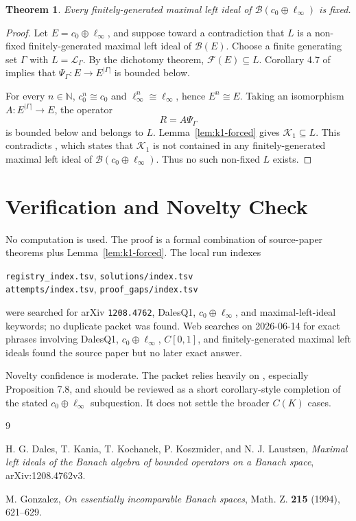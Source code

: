 \documentclass[11pt]{article}
\newtheorem{theorem}{Theorem}
\newcommand{\B}{\mathscr{B}}
\newcommand{\F}{\mathscr{F}}
\newcommand{\K}{\mathscr{K}}
\begin{document}
\begin{theorem}
Every finitely-generated maximal left ideal of
\(\B(c_0\oplus\ell_\infty)\) is fixed.
\end{theorem}

\begin{proof}
Let \(E=c_0\oplus\ell_\infty\), and suppose toward a contradiction that
\(L\) is a non-fixed finitely-generated maximal left ideal of \(\B(E)\).
Choose a finite generating set \(\Gamma\) with
\(L=\mathscr{L}_\Gamma\).  By the dichotomy theorem,
\(\F(E)\subseteq L\).  Corollary 4.7 of \cite{DKKKL} implies that
\(\Psi_\Gamma:E\to E^{|\Gamma|}\) is bounded below.

For every \(n\in\mathbb{N}\), \(c_0^n\cong c_0\) and
\(\ell_\infty^n\cong\ell_\infty\), hence \(E^n\cong E\).  Taking an
isomorphism \(A:E^{|\Gamma|}\to E\), the operator
\[
  R=A\Psi_\Gamma
\]
is bounded below and belongs to \(L\).  Lemma~\ref{lem:k1-forced} gives
\(\K_1\subseteq L\).  This contradicts \cite[Proposition 7.8]{DKKKL},
which states that \(\K_1\) is not contained in any finitely-generated
maximal left ideal of \(\B(c_0\oplus\ell_\infty)\).  Thus no such non-fixed
\(L\) exists.
\end{proof}

\section*{Verification and Novelty Check}

No computation is used.  The proof is a formal combination of source-paper
theorems plus Lemma~\ref{lem:k1-forced}.  The local run indexes
\begin{center}
\small
\texttt{registry\_index.tsv}, \texttt{solutions/index.tsv}\\
\texttt{attempts/index.tsv}, \texttt{proof\_gaps/index.tsv}
\end{center}
were searched for arXiv \texttt{1208.4762}, DalesQ1,
\(c_0\oplus\ell_\infty\), and maximal-left-ideal keywords; no duplicate
packet was found.  Web searches on 2026-06-14 for exact phrases involving
DalesQ1, \(c_0\oplus\ell_\infty\), \(C[0,1]\), and finitely-generated maximal
left ideals found the source paper but no later exact answer.

Novelty confidence is moderate.  The packet relies heavily on \cite{DKKKL},
especially Proposition 7.8, and should be reviewed as a short corollary-style
completion of the stated \(c_0\oplus\ell_\infty\) subquestion.  It does not
settle the broader \(C(K)\) cases.

\begin{thebibliography}{9}

H. G. Dales, T. Kania, T. Kochanek, P. Koszmider, and N. J. Laustsen,
\emph{Maximal left ideals of the Banach algebra of bounded operators on a
Banach space}, arXiv:1208.4762v3.

M. Gonzalez, \emph{On essentially incomparable Banach spaces}, Math. Z.
\textbf{215} (1994), 621--629.

\end{thebibliography}
\end{document}
